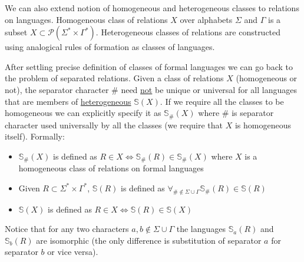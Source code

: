 \documentclass[12pt]{article}
\begin{document}
We can also extend notion of homogeneous and heterogeneous classes to relations on languages. Homogeneous class of relations $X$ over alphabets $\Sigma$ and $\Gamma$ is a subset $X \subset \mathcal{P}(\Sigma^* \times \Gamma^*)$. Heterogeneous classes of relations are constructed using analogical rules of formation as classes of languages.

After settling precise definition of classes of formal languages we can go back to the problem of separated relations. Given a class of relations $X$ (homogeneous or not), the separator character $\#$ need \underline{not} be unique or universal for all languages that are members of \underline{heterogeneous} $\mathbb{ S}(X)$. If we require all the classes to be homogeneous we can explicitly specify it as $\mathbb{ S}_\#(X)$ where $\#$ is separator character used universally by all the classes (we require that $X$ is homogeneous itself). Formally:
\begin{itemize}
	\item $\mathbb{ S}_\#(X) $ is defined as $ R \in X \iff \mathbb{ S}_\#(R) \in \mathbb{ S}_\#(X)  $ where $X$ is a homogeneous  class of relations on formal languages
	\item Given $R \subset \Sigma^* \times \Gamma^*$, $\mathbb{ S}(R)$  is defined as $\forall_{\# \notin \Sigma \cup \Gamma} \mathbb{ S}_\#(R) \in \mathbb{ S}(R)$ 
	\item $\mathbb{ S}(X)$ is defined as  $R \in X \iff \mathbb{ S}(R) \in \mathbb{ S}(X)  $
\end{itemize} 
 Notice that for any two characters $a,b \notin \Sigma \cup \Gamma$ the languages $\mathbb{S}_a(R)$ and $\mathbb{S}_b(R)$ are isomorphic (the only difference is substitution of separator $a$ for separator $b$ or vice versa). 
 
\end{document}
